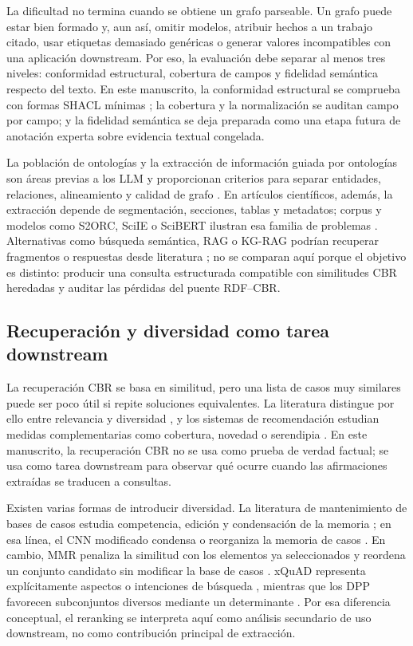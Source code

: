 \documentclass[11pt,a4paper]{article}
\begin{document}
La dificultad no termina cuando se obtiene un grafo parseable. Un grafo puede estar bien formado y, aun así, omitir modelos, atribuir hechos a un trabajo citado, usar etiquetas demasiado genéricas o generar valores incompatibles con una aplicación downstream. Por eso, la evaluación debe separar al menos tres niveles: conformidad estructural, cobertura de campos y fidelidad semántica respecto del texto. En este manuscrito, la conformidad estructural se comprueba con formas SHACL mínimas \citep{SHACL2017}; la cobertura y la normalización se auditan campo por campo; y la fidelidad semántica se deja preparada como una etapa futura de anotación experta sobre evidencia textual congelada.

La población de ontologías y la extracción de información guiada por ontologías son áreas previas a los LLM y proporcionan criterios para separar entidades, relaciones, alineamiento y calidad de grafo \citep{WimalasuriyaDou2010OntologyIE,Petasis2011OntologyPopulation,Hogan2021KnowledgeGraphs,Zaveri2016LinkedDataQuality}. En artículos científicos, además, la extracción depende de segmentación, secciones, tablas y metadatos; corpus y modelos como S2ORC, SciIE o SciBERT ilustran esa familia de problemas \citep{Luan2018SciIE,Beltagy2019SciBERT,Lo2020S2ORC}. Alternativas como búsqueda semántica, RAG o KG-RAG podrían recuperar fragmentos o respuestas desde literatura \citep{Lewis2020RAG}; no se comparan aquí porque el objetivo es distinto: producir una consulta estructurada compatible con similitudes CBR heredadas y auditar las pérdidas del puente RDF--CBR.

\subsection{Recuperación y diversidad como tarea downstream}

La recuperación CBR se basa en similitud, pero una lista de casos muy similares puede ser poco útil si repite soluciones equivalentes. La literatura distingue por ello entre relevancia y diversidad \citep{SmythMcClave2001Diversity,McSherry2002Diversity}, y los sistemas de recomendación estudian medidas complementarias como cobertura, novedad o serendipia \citep{KaminskasBridge2016BeyondAccuracy}. En este manuscrito, la recuperación CBR no se usa como prueba de verdad factual; se usa como tarea downstream para observar qué ocurre cuando las afirmaciones extraídas se traducen a consultas.

Existen varias formas de introducir diversidad. La literatura de mantenimiento de bases de casos estudia competencia, edición y condensación de la memoria \citep{SmythMcKenna1999Competence}; en esa línea, el CNN modificado condensa o reorganiza la memoria de casos \citep{MunozPena2025Diversity}. En cambio, MMR penaliza la similitud con los elementos ya seleccionados y reordena un conjunto candidato sin modificar la base de casos \citep{CarbonellGoldstein1998MMR}. xQuAD representa explícitamente aspectos o intenciones de búsqueda \citep{Santos2010xQuAD}, mientras que los DPP favorecen subconjuntos diversos mediante un determinante \citep{Gan2020DPP}. Por esa diferencia conceptual, el reranking se interpreta aquí como análisis secundario de uso downstream, no como contribución principal de extracción.
\end{document}
